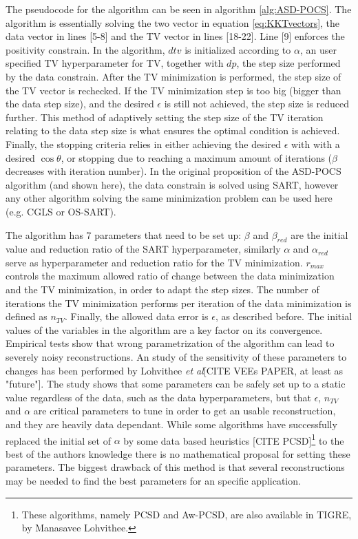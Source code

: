 The pseudocode for the algorithm can be seen in algorithm \ref{alg:ASD-POCS}. The algorithm is essentially solving the two vector in equation \ref{eq:KKTvectors}, the data vector in lines [5-8] and the TV vector in lines [18-22]. Line [9] enforces the positivity constrain. In the algorithm, $dtv$ is initialized according to $\alpha$, an user specified   TV hyperparameter for TV, together with $dp$, the step size performed by the data constrain. After the TV minimization is performed, the step size of the TV vector is rechecked. If the TV minimization step is too big (bigger than the data step size), and the desired $\epsilon$ is still not achieved, the step size is reduced further. This method of adaptively setting the step size of the TV iteration relating to the data step size is what ensures the optimal condition is achieved. Finally, the stopping criteria relies in either achieving the desired $\epsilon$ with with a desired $\cos \theta$, or stopping due to reaching a maximum amount of iterations ($\beta$ decreases with iteration number). In the original proposition of the ASD-POCS algorithm (and shown here), the data constrain is solved using SART, however any other algorithm solving the same minimization problem can be used here (e.g. CGLS or OS-SART).


The algorithm has 7 parameters that need to be set up: $\beta$ and $\beta_{red}$ are the initial value and reduction ratio of the SART hyperparameter, similarly $\alpha$ and $\alpha_{red}$ serve as hyperparameter and reduction ratio for the TV minimization. $r_{max}$ controls the maximum allowed ratio of change between the data minimization and the TV minimization, in order to adapt the step sizes. The number of iterations the TV minimization performs per iteration of the data minimization is defined as $n_{TV}$. Finally, the allowed data error is $\epsilon$, as described before. The initial values of the variables in the algorithm are a key factor on its convergence. Empirical tests show that wrong parametrization of the algorithm can lead to severely noisy reconstructions. An study of the sensitivity of these parameters to changes has been performed by Lohvithee \emph{et al}[CITE VEEs PAPER, at least as "future"]. The study shows that some parameters can be safely set up to a static value regardless of the data, such as the data hyperparameters, but that $\epsilon$, $n_{TV}$ and $\alpha$ are critical parameters to tune in order to get an usable reconstruction, and they are heavily data dependant. While some algorithms have successfully replaced the initial set of $\alpha$ by some data based heuristics [CITE PCSD]\footnote{These algorithms, namely PCSD and Aw-PCSD, are also available in TIGRE, by Manasavee Lohvithee.} to the best of the authors knowledge there is no mathematical proposal for setting these parameters. The biggest drawback of this method is that several reconstructions may be needed to find the best parameters for an specific application.

